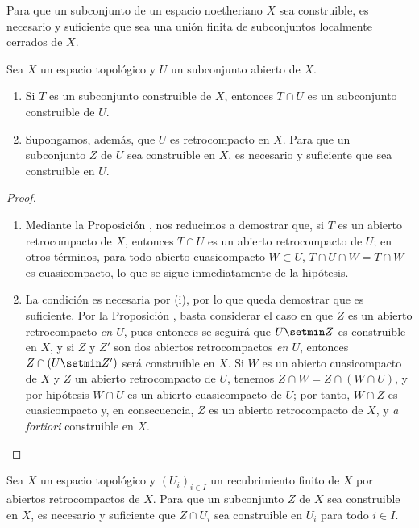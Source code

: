 \documentclass[oneside]{amsart}
\let\EGAOriginalLabel\label
\renewcommand{\label}[1]{\phantomsection\EGAOriginalLabel{#1}}
\begin{document}
\begin{corollary}[9.1.7]
\label{0.9.1.7}
Para que un subconjunto de un espacio noetheriano $X$ sea construible, es necesario y suficiente que sea una unión finita de subconjuntos localmente cerrados de $X$.
\end{corollary}

\begin{proposition}[9.1.8]
\label{0.9.1.8}
Sea $X$ un espacio topológico y $U$ un subconjunto abierto de $X$.
\begin{enumerate}
  \item[{\rm(i)}] Si $T$ es un subconjunto construible de $X$, entonces $T\cap U$ es un subconjunto construible de $U$.
  \item[{\rm(ii)}] Supongamos, además, que $U$ es retrocompacto en $X$. Para que un subconjunto $Z$ de $U$ sea construible en $X$, es necesario y suficiente que sea construible en $U$.
\end{enumerate}
\end{proposition}

\begin{proof}
\medskip\noindent
\begin{enumerate}
  \item[(i)] Mediante la Proposición , nos reducimos a demostrar que, si $T$ es un abierto retrocompacto de $X$, entonces $T\cap U$ es un abierto retrocompacto de $U$; en otros términos, para todo abierto cuasicompacto $W\subset U$, $T\cap U\cap W=T\cap W$ es cuasicompacto, lo que se sigue inmediatamente de la hipótesis.
  \item[(ii)] La condición es necesaria por (i), por lo que queda demostrar que es suficiente.
    Por la Proposición , basta considerar el caso en que $Z$ es un abierto retrocompacto \emph{en $U$}, pues entonces se seguirá que $U\setmin Z$ es construible en $X$, y si $Z$ y $Z'$ son dos abiertos retrocompactos \emph{en $U$}, entonces $Z\cap(U\setmin Z')$ será construible en $X$.
    Si $W$ es un abierto cuasicompacto de $X$ y $Z$ un abierto retrocompacto de $U$, tenemos $Z\cap W=Z\cap(W\cap U)$, y por hipótesis $W\cap U$ es un abierto cuasicompacto de $U$; por tanto, $W\cap Z$ es cuasicompacto y, en consecuencia, $Z$ es un abierto retrocompacto de $X$, y \emph{a fortiori} construible en $X$.
\end{enumerate}
\end{proof}

\begin{corollary}[9.1.9]
\label{0.9.1.9}
Sea $X$ un espacio topológico y $(U_i)_{i\in I}$ un recubrimiento finito de $X$ por abiertos retrocompactos de $X$.
Para que un subconjunto $Z$ de $X$ sea construible en $X$, es necesario y suficiente que $Z\cap U_i$ sea construible en $U_i$ para todo $i\in I$.
\end{corollary}
\end{document}
